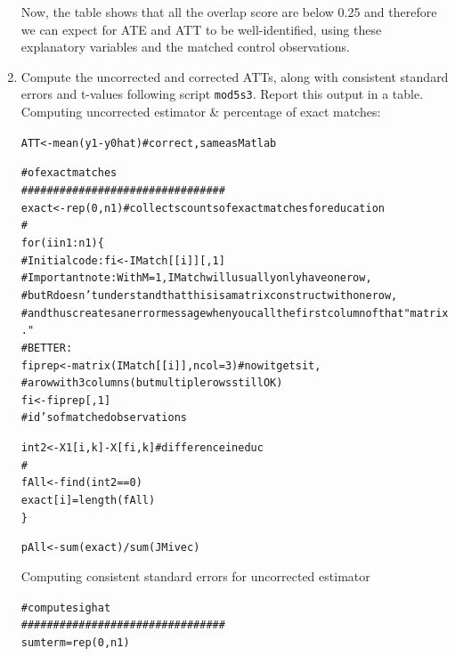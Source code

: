 \documentclass[11pt,reqno]{amsart}\usepackage[]{graphicx}\usepackage[]{color}
\makeatletter
\newcommand{\hlnum}[1]{\textcolor[rgb]{0.063,0.58,0.627}{#1}}%
\newcommand{\hlcom}[1]{\textcolor[rgb]{0.588,0.588,0.588}{#1}}%
\newcommand{\hlopt}[1]{\textcolor[rgb]{0.196,0.196,0.196}{#1}}%
\newcommand{\hlstd}[1]{\textcolor[rgb]{0.196,0.196,0.196}{#1}}%
\newcommand{\hlkwa}[1]{\textcolor[rgb]{0.231,0.416,0.784}{#1}}%
\newcommand{\hlkwb}[1]{\textcolor[rgb]{0.627,0,0.314}{#1}}%
\newcommand{\hlkwc}[1]{\textcolor[rgb]{0,0.631,0.314}{#1}}%
\newcommand{\hlkwd}[1]{\textcolor[rgb]{0.78,0.227,0.412}{#1}}%
\newenvironment{kframe}{%
 \def\at@end@of@kframe{}%
 \ifinner\ifhmode%
  \def\at@end@of@kframe{\end{minipage}}%
  \begin{minipage}{\columnwidth}%
 \fi\fi%
 \def\FrameCommand##1{\hskip\@totalleftmargin \hskip-\fboxsep
 \colorbox{shadecolor}{##1}\hskip-\fboxsep
     \hskip-\linewidth \hskip-\@totalleftmargin \hskip\columnwidth}%
 \MakeFramed {\advance\hsize-\width
   \@totalleftmargin\z@ \linewidth\hsize
   \@setminipage}}%
 {\par\unskip\endMakeFramed%
 \at@end@of@kframe}
\newcommand{\ksp}{\vspace{0.1in}}   %
\makeatother
\begin{document}
\begin{enumerate}
\ksp


Now, the table shows that all the overlap score are below 0.25 and therefore we can expect for ATE and ATT to be well-identified, using these explanatory variables and the matched control observations. 


\item Compute the uncorrected and corrected ATTs, along with consistent standard errors and t-values following script \texttt{mod5s3}. Report this output in a table.\\

Computing uncorrected estimator \& percentage of exact matches:
\begin{kframe}
\begin{alltt}
\hlstd{ATT} \hlkwb{<-} \hlkwd{mean}\hlstd{(y1} \hlopt{-} \hlstd{y0hat)} \hlcom{#correct, same as Matlab}

\hlcom{# of exact matches}
\hlcom{################################}
\hlstd{exact} \hlkwb{<-} \hlkwd{rep}\hlstd{(}\hlnum{0}\hlstd{, n1)} \hlcom{#collects counts of exact matches for education}
\hlcom{#}
\hlkwa{for} \hlstd{(i} \hlkwa{in} \hlnum{1}\hlopt{:}\hlstd{n1) \{}
  \hlcom{#Initial code: fi<-IMatch[[i]][,1]}
  \hlcom{#Important note: With M=1, IMatch will usually only have one row,}
  \hlcom{#but R doesn't understand that this is a matrix construct with one row,}
  \hlcom{#and thus creates an error message when you call the first column of that "matrix."}
  \hlcom{#BETTER:}
  \hlstd{fiprep} \hlkwb{<-} \hlkwd{matrix}\hlstd{(IMatch[[i]],} \hlkwc{ncol} \hlstd{=} \hlnum{3}\hlstd{)} \hlcom{# now it gets it,}
  \hlcom{# a row with 3 columns (but multiple rows still OK)}
  \hlstd{fi} \hlkwb{<-} \hlstd{fiprep[,} \hlnum{1}\hlstd{]}
  \hlcom{#id's of matched observations}

  \hlstd{int2} \hlkwb{<-} \hlstd{X1[i, k]} \hlopt{-} \hlstd{X[fi, k]} \hlcom{#difference in educ}
  \hlcom{#}
  \hlstd{fAll} \hlkwb{<-} \hlkwd{find}\hlstd{(int2} \hlopt{==} \hlnum{0}\hlstd{)}
  \hlstd{exact[i]} \hlkwb{=} \hlkwd{length}\hlstd{(fAll)}
\hlstd{\}}

\hlstd{pAll} \hlkwb{<-} \hlkwd{sum}\hlstd{(exact)} \hlopt{/} \hlkwd{sum}\hlstd{(JMivec)}
\end{alltt}
\end{kframe}

Computing consistent standard errors for uncorrected estimator

\begin{kframe}
\begin{alltt}
\hlcom{# compute sighat}
\hlcom{################################}
\hlstd{sumterm} \hlkwb{=} \hlkwd{rep}\hlstd{(}\hlnum{0}\hlstd{, n1)}


\end{alltt}
\end{kframe}
\end{enumerate}
\end{document}

